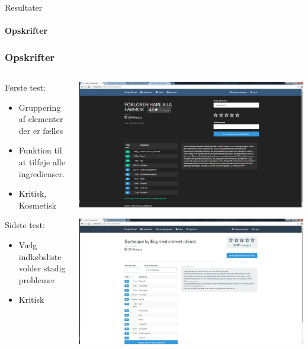 \begin{frame}{Resultater}
\framesubtitle{Opskrifter}
	\subsubsection{Opskrifter}
	
	\begin{minipage}[0.3\textheight]{\textwidth}
	\begin{columns}[T]
	\begin{column}{0.5\textwidth}
	
	Første test:
	\begin{itemize}
	\item Gruppering af elementer der er fælles
	\item Funktion til at tilføje alle ingredienser.
	\item Kritisk, Kosmetisk
	\end{itemize}
	Sidste test:
	\begin{itemize}
		\item Vælg indkøbsliste volder stadig problemer
		\item Kritisk
	\end{itemize}
	\end{column}
	\begin{column}{0.5\textwidth}
	 \includegraphics[width=1\textwidth,height=1\textheight,keepaspectratio, trim={1cm 0 0 16mm}, clip]{images/Screenshots/PickedRecipeOld.png}
	 
	 \vspace{2 mm}
	  
	  \includegraphics[width=1\textwidth,height=1\textheight,keepaspectratio, trim={1cm 0 0 16mm}, clip]{images/Screenshots/PickedRecipe.png}
	\end{column}
	\end{columns}
	


\end{minipage}
\end{frame}
